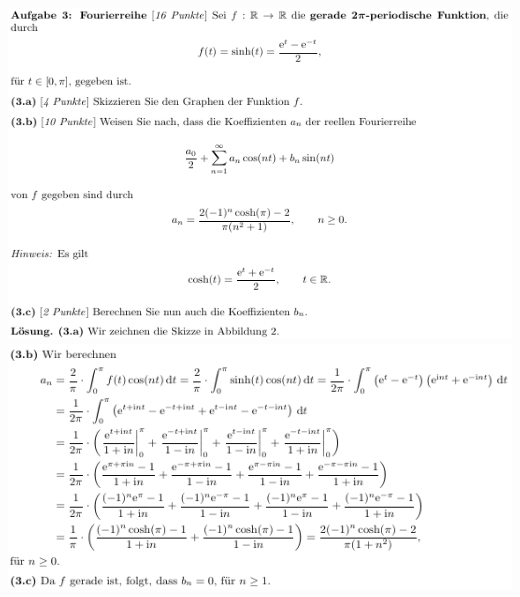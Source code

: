 \includegraphics[width=1\textwidth]{images/img_koma/example_1.4.1_hs19.png}
\includegraphics[width=1\textwidth]{images/img_koma/example_1.4.2_hs19.png}

